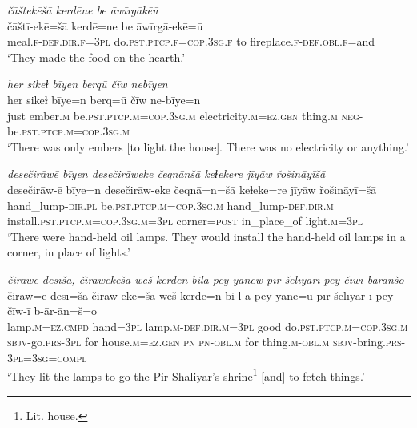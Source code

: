 \ea \label{ŽE.39}
\textit{čāštekēšā kerdēne be āwīrgākēū} \\ 
\gll čāštī-ekē=šā kerdē=ne be āwīrgā-ekē=ū \\ 
 meal\textsc{.f}\textsc{-def}\textsc{.dir}\textsc{.f}\textsc{=3pl} do\textsc{.pst}\textsc{.ptcp}\textsc{.f}\textsc{=cop}\textsc{.3sg}\textsc{.f} to fireplace\textsc{.f}\textsc{-def}\textsc{.obl}\textsc{.f}=and \\ 
\glt `They made the food on the hearth.'
\z 
 
\ea \label{ŽE.40}
\textit{her sikeɫ bīyen berqū čīw nebīyen} \\ 
\gll her sikeɫ bīye=n berq=ū čīw ne-bīye=n \\ 
 just ember\textsc{.m} be\textsc{.pst}\textsc{.ptcp}\textsc{.m}\textsc{=cop}\textsc{.3sg}\textsc{.m} electricity\textsc{.m}\textsc{\textsc{=ez.gen}} thing\textsc{.m} \textsc{neg-}be\textsc{.pst}\textsc{.ptcp}\textsc{.m}\textsc{=cop}\textsc{.3sg}\textsc{.m} \\ 
\glt `There was only embers [to light the house]. There was no electricity or anything.'
\z 
 
\ea \label{ŽE.41}
\textit{desečirāwē bīyen desečirāweke čeqnānšā keɫekere jīyāw řošināyīšā} \\ 
\gll desečirāw-ē bīye=n desečirāw-eke čeqnā=n=šā keɫeke=re jīyāw řošināyī=šā \\ 
 hand\_lump\textsc{-dir}\textsc{.pl} be\textsc{.pst}\textsc{.ptcp}\textsc{.m}\textsc{=cop}\textsc{.3sg}\textsc{.m} hand\_lump\textsc{-def}\textsc{.dir}\textsc{.m} install\textsc{.pst}\textsc{.ptcp}\textsc{.m}\textsc{=cop}\textsc{.3sg}\textsc{.m}\textsc{=3pl} corner\textsc{=\textsc{post}} in\_place\_of light\textsc{.m}\textsc{=3pl} \\ 
\glt `There were hand-held oil lamps. They would install the hand-held oil lamps in a corner, in place of lights.'
\z 
 
\ea \label{ŽE.42}
\textit{čirāwe desīšā, čirāwekešā weš kerden bilā pey yānew pīr šelīyārī pey čīwī bārānšo} \\ 
\gll čirāw=e desī=šā čirāw-eke=šā weš kerde=n bi-l-ā pey yāne=ū pīr šelīyār-ī pey čīw-ī b-ār-ān=š=o \\ 
 lamp\textsc{.m}\textsc{=ez}\textsc{.cmpd} hand\textsc{=3pl} lamp\textsc{.m}\textsc{-def}\textsc{.dir}\textsc{.m}\textsc{=3pl} good do\textsc{.pst}\textsc{.ptcp}\textsc{.m}\textsc{=cop}\textsc{.3sg}\textsc{.m} \textsc{sbjv-}go\textsc{.prs}\textsc{-3pl} for house\textsc{.m}\textsc{\textsc{=ez.gen}} \textsc{pn} \textsc{pn}\textsc{-obl}\textsc{.m} for thing\textsc{.m}\textsc{-obl}\textsc{.m} \textsc{sbjv-}bring\textsc{.prs}\textsc{-3pl}\textsc{=3sg}\textsc{=compl} \\ 
\glt `They lit the lamps to go the Pir Shaliyar’s shrine\footnote{Lit. house.} [and] to fetch things.'
\z 
 
